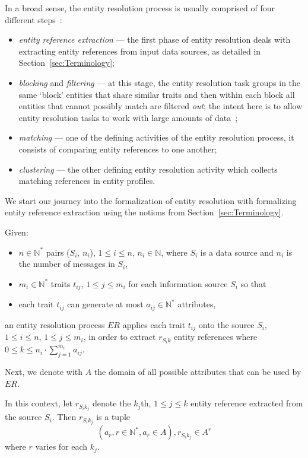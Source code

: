 In a broad sense, the entity resolution process is usually comprised of four
different steps~\cite{Pap19,Tal11}:

\begin{itemize}
    \item \textit{entity reference extraction} --- the first phase of entity
    resolution deals with extracting entity references from input data
    sources, as detailed in Section~\ref{sec:Terminology};
    \item \textit{blocking} and \textit{filtering} --- at this stage, the
    entity resolution task groups in the same `block' entities that share
    similar traits and then within each block all entities that cannot
    possibly match are filtered \textit{out}; the intent here is to allow
    entity resolution tasks to work with large amounts of data~\cite{Pap19};
    \item \textit{matching} --- one of the defining activities of the entity
    resolution process, it consists of comparing entity references to one
    another;
    \item \textit{clustering} --- the other defining entity resolution
    activity which collects matching references in entity profiles.
\end{itemize}

We start our journey into the formalization of entity resolution with
formalizing entity reference extraction using the notions from
Section~\ref{sec:Terminology}.

Given:
\begin{itemize}
    \item $n \in \mathbb{N}^*$ pairs ($S_i$, $n_i$), $1 \leq i \leq n$, $n_i \in \mathbb{N}$, 
    where $S_i$ is a data source and $n_i$ is the number of messages in
    $S_i$,
    \item $m_i \in \mathbb{N}^*$ traits $t_{ij}$, $1 \leq j \leq m_i$ for each
    information source $S_i$ so that
    \item each trait $t_{ij}$ can generate at most $a_{ij} \in \mathbb{N}^*$
    attributes,
\end{itemize}
an entity resolution process $ER$ applies each trait $t_{ij}$ onto the source
$S_i$, $1 \leq i \leq n$, $1 \leq j \leq m_i$, in order to extract
$r_{{S_i}k}$ entity references where
$0 \leq k \leq n_i \cdot \sum^{m_i}_{j=1}a_{ij}$.

Next, we denote with $A$ the domain of all possible attributes that can be
used by $ER$.

In this context, let $r_{{S_i}{k_j}}$ denote the $k_j$th, $1 \leq j \leq k$
entity reference extracted from the source $S_i$.
Then $r_{{S_i}{k_j}}$ is a tuple
\[
    (a_r, r \in \mathbb{N}^*, a_r \in A), r_{{S_i}{k_j}} \in A^r
\]
where $r$ varies for each $k_j$.

